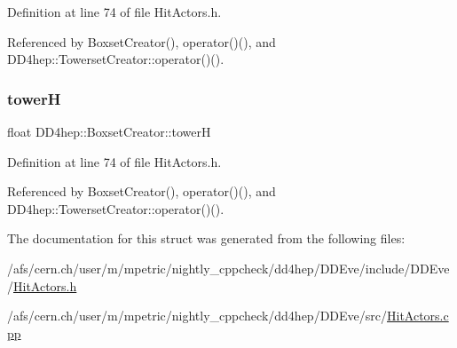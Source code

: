 Definition at line 74 of file Hit\+Actors.\+h.



Referenced by Boxset\+Creator(), operator()(), and D\+D4hep\+::\+Towerset\+Creator\+::operator()().

\hypertarget{struct_d_d4hep_1_1_boxset_creator_a5a4d59452a3be79b9fd59911eb5b555c}{}\label{struct_d_d4hep_1_1_boxset_creator_a5a4d59452a3be79b9fd59911eb5b555c} 
\subsubsection{\texorpdfstring{towerH}{towerH}}
{\footnotesize\ttfamily float D\+D4hep\+::\+Boxset\+Creator\+::towerH}



Definition at line 74 of file Hit\+Actors.\+h.



Referenced by Boxset\+Creator(), operator()(), and D\+D4hep\+::\+Towerset\+Creator\+::operator()().



The documentation for this struct was generated from the following files\+:\begin{DoxyCompactItemize}
\item 
/afs/cern.\+ch/user/m/mpetric/nightly\+\_\+cppcheck/dd4hep/\+D\+D\+Eve/include/\+D\+D\+Eve/\hyperlink{_hit_actors_8h}{Hit\+Actors.\+h}\item 
/afs/cern.\+ch/user/m/mpetric/nightly\+\_\+cppcheck/dd4hep/\+D\+D\+Eve/src/\hyperlink{_hit_actors_8cpp}{Hit\+Actors.\+cpp}\end{DoxyCompactItemize}
